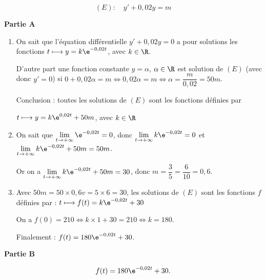 \medskip







\[(E) : \quad  y'  +0,02y = m\]

\medskip

\textbf{Partie A}

\medskip

\begin{enumerate}
\item 







On sait que l'équation différentielle $y' + 0,02y = 0$ a pour solutions les fonctions $t \longmapsto y = k\e^{-0,02t}$, avec $k \in \R$.

D'autre part une fonction constante $y = \alpha$, \:$\alpha \in \R$ est solution de $(E)$ (avec donc $y' = 0$) si $0 + 0,02\alpha = m \iff 0,02\alpha = m \iff \alpha = \dfrac{m}{0,02} = 50m$.

Conclusion : toutes les solutions de $(E)$ sont les fonctions définies par 
\begin{center} $t \longmapsto y = k\e^{0,02t} + 50m$, \: avec $k \in \R$\end{center}
\item 


On sait que $\displaystyle\lim_{t \to + \infty} \e^{-0,02t} = 0$, donc $\displaystyle\lim_{t \to + \infty} k\e^{-0,02t} = 0$ et $\displaystyle\lim_{t \to + \infty} k\e^{-0,02t} + 50m = 50m$.

Or on a $\displaystyle\lim_{t \to + \infty} k\e^{-0,02t} + 50m  = 30$, donc $m = \dfrac35 = \dfrac{6}{10} = 0,6$.
\item 

Avec $50m = 50 \times 0,6 v= 5 \times 6 = 30$, les solutions de $(E)$ sont les fonctions $f$ définies par : $ t \longmapsto f(t) = k\e^{-0,02t} + 30$

On a $f(0) = 210 \iff k \times 1 + 30 = 210 \iff k = 180$.

Finalement : $f(t) = 180\e^{-0,02t} + 30$.
\end{enumerate}

\medskip

\textbf{Partie B}

\medskip



\[f(t) =180 \e^{-0,02t} + 30.\]

